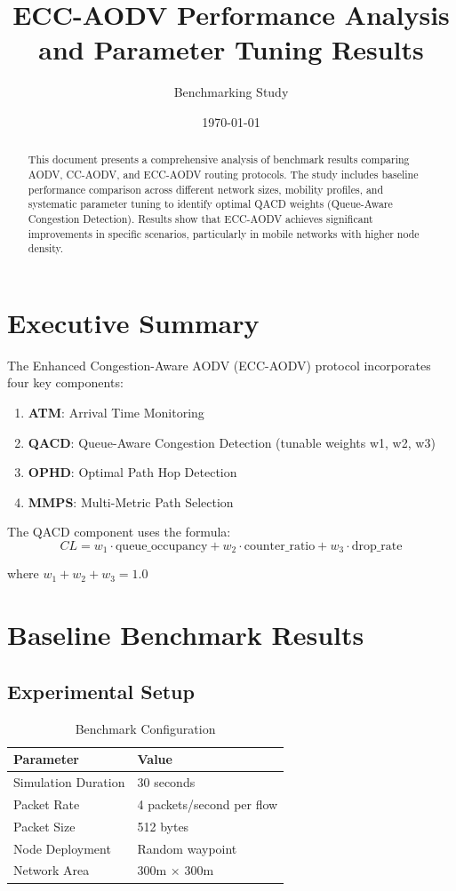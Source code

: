 \documentclass[11pt,a4paper]{article}
\title{ECC-AODV Performance Analysis and Parameter Tuning Results}
\author{Benchmarking Study}
\date{\today}
\begin{document}
\maketitle

\begin{abstract}
This document presents a comprehensive analysis of benchmark results comparing AODV, CC-AODV, and ECC-AODV routing protocols. The study includes baseline performance comparison across different network sizes, mobility profiles, and systematic parameter tuning to identify optimal QACD weights (Queue-Aware Congestion Detection). Results show that ECC-AODV achieves significant improvements in specific scenarios, particularly in mobile networks with higher node density.
\end{abstract}

\section{Executive Summary}

The Enhanced Congestion-Aware AODV (ECC-AODV) protocol incorporates four key components:
\begin{enumerate}
    \item \textbf{ATM}: Arrival Time Monitoring
    \item \textbf{QACD}: Queue-Aware Congestion Detection (tunable weights w1, w2, w3)
    \item \textbf{OPHD}: Optimal Path Hop Detection
    \item \textbf{MMPS}: Multi-Metric Path Selection
\end{enumerate}

The QACD component uses the formula:
\begin{equation}
CL = w_1 \cdot \text{queue\_occupancy} + w_2 \cdot \text{counter\_ratio} + w_3 \cdot \text{drop\_rate}
\end{equation}

where $w_1 + w_2 + w_3 = 1.0$

\section{Baseline Benchmark Results}

\subsection{Experimental Setup}

\begin{table}[H]
\centering
\caption{Benchmark Configuration}
\begin{tabular}{ll}
\toprule
\textbf{Parameter} & \textbf{Value} \\
\midrule
Simulation Duration & 30 seconds \\
Packet Rate & 4 packets/second per flow \\
Packet Size & 512 bytes \\
Node Deployment & Random waypoint \\
Network Area & 300m × 300m \\
\bottomrule
\end{tabular}
\end{table}
\end{document}
